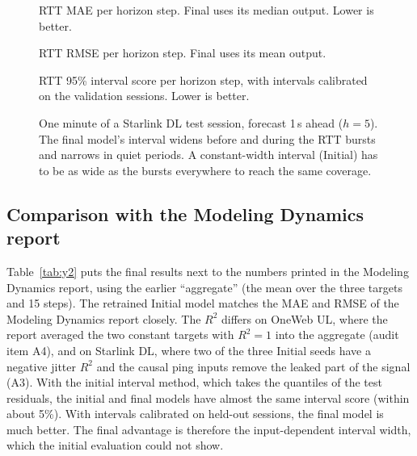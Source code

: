 \begin{figure}[p]
  \centering
  \resizebox{\linewidth}{!}{}
  \caption{RTT MAE per horizon step. Final uses its median output. Lower is better.}
  \label{fig:mae}
\end{figure}

\begin{figure}[p]
  \centering
  \resizebox{\linewidth}{!}{}
  \caption{RTT RMSE per horizon step. Final uses its mean output.}
  \label{fig:rmse}
\end{figure}

\begin{figure}[t]
  \centering
  \resizebox{\linewidth}{!}{}
  \caption{RTT 95\% interval score per horizon step, with intervals calibrated on the validation sessions. Lower is better.}
  \label{fig:mis}
\end{figure}

\begin{figure}[t]
  \centering
  \resizebox{\linewidth}{!}{}
  \caption{One minute of a Starlink DL test session, forecast 1\,s ahead ($h=5$). The final model's interval widens before and during the RTT bursts and narrows in quiet periods. A constant-width interval (Initial) has to be as wide as the bursts everywhere to reach the same coverage.}
  \label{fig:trace}
\end{figure}

\subsection{Comparison with the Modeling Dynamics report}
Table~\ref{tab:y2} puts the final results next to the numbers printed in the Modeling Dynamics report, using the earlier ``aggregate'' (the mean over the three targets and 15 steps). The retrained Initial model matches the MAE and RMSE of the Modeling Dynamics report closely. The $R^2$ differs on OneWeb UL, where the report averaged the two constant targets with $R^2=1$ into the aggregate (audit item A4), and on Starlink DL, where two of the three Initial seeds have a negative jitter $R^2$ and the causal ping inputs remove the leaked part of the signal (A3). With the initial interval method, which takes the quantiles of the test residuals, the initial and final models have almost the same interval score (within about 5\%). With intervals calibrated on held-out sessions, the final model is much better. The final advantage is therefore the input-dependent interval width, which the initial evaluation could not show.


